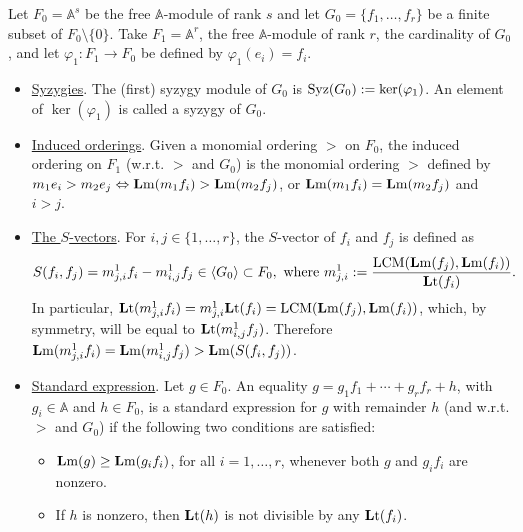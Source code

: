 \documentclass[ALCO]{cedram}
\newcommand{\mba}{\mbox{$\mathbb{A}$}}
\newcommand{\lm}{\mbox{${\bf L}{\rm m}$}}
\newcommand{\lt}{\mbox{${\bf L}{\rm t}$}}
\newcommand{\syz}{\mbox{${\rm Syz}$}}
\newcommand{\Lcm}{\mbox{${\rm LCM}$}}
\begin{document}
\begin{definitions}\label{secondsetofdefinitions}
Let $F_0=\mba^s$ be the free $\mba$-module of rank $s$ and let
$G_0=\{f_1,\ldots ,f_r\}$ be a finite subset of
$F_0\setminus\{0\}$. Take $F_1=\mba^r$, the free $\mba$-module of rank $r$,
the cardinality of $G_0$, and let $\varphi_1:F_1\rightarrow F_0$ be
defined by $\varphi_1(e_i)=f_i$.
\begin{itemize}
\item[$(5)$] \underline{\sc Syzygies}. The (first) syzygy module of
  $G_0$ is $\syz(G_0):=\ker(\varphi_1)$. An element of $\ker(\varphi_1)$ is
  called a syzygy of $G_0$.
\item[$(6)$] \underline{\sc Induced orderings}. Given a monomial
  ordering $>$ on $F_0$, the induced ordering on $F_1$ (w.r.t. $>$ and
  $G_0$) is the monomial ordering $>$ defined by
  $m_1e_i>m_2e_j\Leftrightarrow \lm(m_1f_i)>\lm(m_2f_j)$, or
  $\lm(m_1f_i)=\lm(m_2f_j)$ and $i>j$.
\item[$(7)$] \underline{\sc The $S$-vectors}. For $i,j\in\{ 1,\ldots
  ,r\}$, the $S$-vector of $f_i$ and $f_j$ is defined as
\begin{eqnarray*}
S(f_i,f_j)=m^1_{j,i}f_i-m^1_{i,j}f_j\in \langle G_0 \rangle\subset
F_0,\mbox{ where } m^1_{j,i}:=\frac{\Lcm(\lm(f_j),\lm(f_i))}{\lt(f_i)}.
\end{eqnarray*}
In particular,
$\lt(m^1_{j,i}f_i)=m^1_{j,i}\lt(f_i)=\Lcm(\lm(f_j),\lm(f_i))$, which,
by symmetry, will be equal to $\lt(m^1_{i,j}f_j)$. Therefore
$\lm(m^1_{j,i}f_i)=\lm(m^1_{i,j}f_j)>\lm(S(f_i,f_j))$.
\item[$(8)$] \underline{\sc Standard expression}. Let $g\in F_0$. An
  equality $g=g_1f_1+\cdots +g_rf_r+h$, with $g_i\in \mba$ and $h\in
  F_0$, is a standard expression for $g$ with remainder $h$ (and
  w.r.t. $>$ and $G_0$) if the following two conditions are satisfied:
\begin{itemize}
\item[$(a)$] $\lm(g)\geq \lm(g_if_i)$, for all $i=1,\ldots ,r$,
  whenever both $g$ and $g_if_i$ are nonzero.
\item[$(b)$] If $h$ is nonzero, then $\lt(h)$ is not divisible by any
  $\lt(f_i)$.
\end{itemize}
\end{itemize}
\end{definitions}
\end{document}
